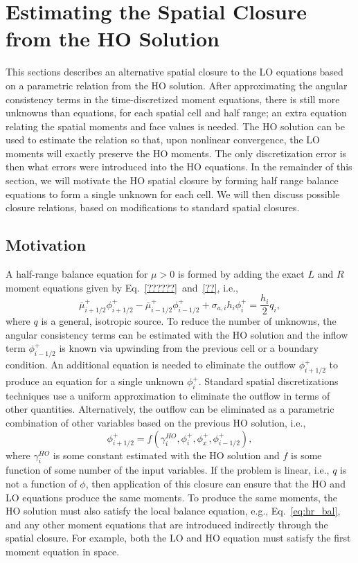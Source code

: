 
\section{Estimating the Spatial Closure from the HO Solution}
\label{sec:spat_clos}

This sections describes an alternative spatial closure to the LO equations based on 
a parametric relation from the HO solution. 
After approximating the angular consistency terms in the time-discretized moment equations, 
there is still more unknowns than equations, for each spatial
cell and half range; an extra equation relating the spatial moments and face values is
needed.  The HO solution can be used to estimate the relation so that, upon nonlinear
convergence, the LO moments will exactly preserve the HO moments.  The only discretization
error is then what errors were introduced into the HO equations.
In the remainder of this section, we will motivate the HO spatial closure by forming half
range balance equations to form a single unknown for each cell.  We will then discuss
possible closure relations, based on modifications to standard spatial closures.


\subsection{Motivation}

A half-range balance equation for $\mu>0$ is formed by adding the
exact $L$ and
$R$ moment equations given by Eq.~\eqref{??????}~and~\eqref{??}, i.e.,
\begin{equation}\label{eq:hr_bal}
    \overline\mu^+_{i+1/2}\phi_{i+1/2}^+ - \overline\mu^+_{i-1/2}\phi_{i-1/2}^+ +
    {\sigma_{a,i}h_i} \phi_i^+ = \frac{h_i}{2} q_i,
\end{equation}
where $q$ is a general, isotropic source.  To reduce the number of unknowns, the angular consistency terms can be estimated
with the HO solution and the inflow term $\phi_{i-1/2}^+$ is known via upwinding from the previous
cell or a boundary condition.  An additional equation is needed to eliminate the outflow $\phi_{i+1/2}^+$ to produce an
equation for a single unknown $\phi_{i}^+$.  Standard spatial discretizations techniques
use a uniform approximation to eliminate the outflow in terms of other quantities.  Alternatively, the outflow can be eliminated as a parametric
combination of other variables based on the previous HO solution, i.e.,
\begin{equation}
    \phi_{i+1/2}^+ = f(\gamma^{HO}_i, \phi_i^+, \phi_x^+, \phi_{i-1/2}^+),
\end{equation}
where $\gamma^{HO}_i$ is some constant estimated with the HO solution and $f$ is some
function of some number of the input
variables.  If the problem is linear, i.e., $q$ is not a function of $\phi$, then application of this
closure can ensure that the HO and LO equations produce the same moments.  To produce the
same moments, the HO solution must also satisfy the local balance equation, e.g.,
Eq.~\eqref{eq:hr_bal}, and any other moment equations that are introduced indirectly
through the spatial closure.  For example, both the LO and HO equation must satisfy the
first moment equation in space.  

